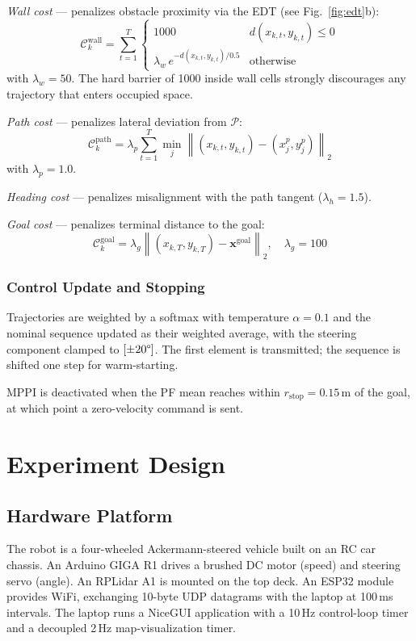 \documentclass[conference]{IEEEtran}
\begin{document}
\textit{Wall cost} — penalizes obstacle proximity via the EDT (see Fig.~\ref{fig:edt}b):
\begin{equation}
\mathcal{C}_k^\mathrm{wall} = \sum_{t=1}^{T} \begin{cases} 1000 & d(x_{k,t},y_{k,t}) \leq 0 \\ \lambda_w\, e^{-d(x_{k,t},y_{k,t})/0.5} & \text{otherwise} \end{cases}
\label{eq:wall_cost}
\end{equation}
with $\lambda_w{=}50$. The hard barrier of 1000 inside wall cells strongly discourages any trajectory that enters occupied space.

\textit{Path cost} — penalizes lateral deviation from $\mathcal{P}$:
\begin{equation}
    \mathcal{C}_k^\mathrm{path} = \lambda_p \sum_{t=1}^{T} \min_{j} \left\lVert (x_{k,t}, y_{k,t}) - (x_j^p, y_j^p) \right\rVert_2
\label{eq:path_cost}
\end{equation}
with $\lambda_p{=}1.0$.

\textit{Heading cost} — penalizes misalignment with the path tangent ($\lambda_h{=}1.5$).

\textit{Goal cost} — penalizes terminal distance to the goal:
\begin{equation}
    \mathcal{C}_k^\mathrm{goal} = \lambda_g \left\lVert (x_{k,T}, y_{k,T}) - \mathbf{x}^\mathrm{goal} \right\rVert_2, \quad \lambda_g{=}100
\label{eq:goal_cost}
\end{equation}

\subsubsection{Control Update and Stopping}
Trajectories are weighted by a softmax with temperature $\alpha{=}0.1$ and the nominal sequence updated as their weighted average, with the steering component clamped to $[\pm20\degree]$. The first element is transmitted; the sequence is shifted one step for warm-starting.

MPPI is deactivated when the PF mean reaches within $r_\mathrm{stop}{=}0.15$\,m of the goal, at which point a zero-velocity command is sent.

\section{Experiment Design}
\label{sec:design}

\subsection{Hardware Platform}
The robot is a four-wheeled Ackermann-steered vehicle built on an RC car chassis. An Arduino GIGA R1 drives a brushed DC motor (speed) and steering servo (angle). An RPLidar A1 is mounted on the top deck. An ESP32 module provides WiFi, exchanging 10-byte UDP datagrams with the laptop at 100\,ms intervals. The laptop runs a NiceGUI application with a 10\,Hz control-loop timer and a decoupled 2\,Hz map-visualization timer.
\end{document}
